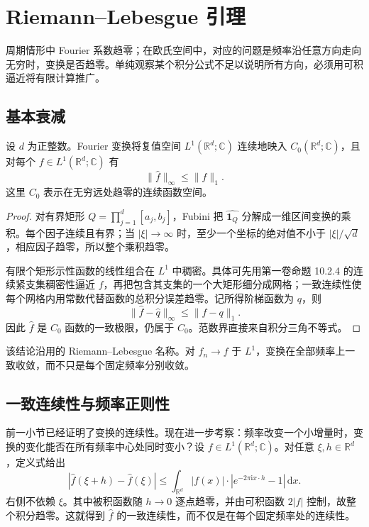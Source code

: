 \section{Riemann--Lebesgue 引理}
\label{b2:sec:0302}

周期情形中 Fourier 系数趋零；在欧氏空间中，对应的问题是频率沿任意方向走向无穷时，变换是否趋零。单纯观察某个积分公式不足以说明所有方向，必须用可积逼近将有限计算推广。

\subsection{基本衰减}
\label{b2:subsec:030201}

\begin{theorem}\label{b2:thm:03-riemann-lebesgue}
设 \(d\) 为正整数。Fourier 变换将复值空间 \(L^1(\mathbb R^d;\mathbb C)\) 连续地映入 \(C_0(\mathbb R^d;\mathbb C)\)，且对每个 \(f\in L^1(\mathbb R^d;\mathbb C)\) 有
\[
 \|\widehat f\|_\infty\leq\|f\|_1.
\]
这里 \(C_0\) 表示在无穷远处趋零的连续函数空间。
\end{theorem}
\begin{proof}
对有界矩形 \(Q=\prod_{j=1}^d[a_j,b_j]\)，Fubini 把 \(\widehat{\mathbf1_Q}\) 分解成一维区间变换的乘积。每个因子连续且有界；当 \(|\xi|\to\infty\) 时，至少一个坐标的绝对值不小于 \(|\xi|/\sqrt d\)，相应因子趋零，所以整个乘积趋零。

有限个矩形示性函数的线性组合在 \(L^1\) 中稠密。具体可先用第一卷命题 10.2.4 的连续紧支集稠密性逼近 \(f\)，再把包含其支集的一个大矩形细分成网格；一致连续性使每个网格内用常数代替函数的总积分误差趋零。记所得阶梯函数为 \(q\)，则
\[
 \|\widehat f-\widehat q\|_\infty\leq\|f-q\|_1.
\]
因此 \(\widehat f\) 是 \(C_0\) 函数的一致极限，仍属于 \(C_0\)。范数界直接来自积分三角不等式。
\end{proof}

该结论沿用的 Riemann--Lebesgue 名称。对 \(f_n\to f\) 于 \(L^1\)，变换在全部频率上一致收敛，而不只是每个固定频率分别收敛。

\subsection{一致连续性与频率正则性}
\label{b2:subsec:030202}

前一小节已经证明了变换的连续性。现在进一步考察：频率改变一个小增量时，变换的变化能否在所有频率中心处同时变小？设 \(f\in L^1(\mathbb R^d;\mathbb C)\)。对任意 \(\xi,h\in\mathbb R^d\)，定义式给出
\[
 |\widehat f(\xi+h)-\widehat f(\xi)|
 \leq\int_{\mathbb R^d}|f(x)|\cdot|e^{-2\pi\mathrm{i}x\cdot h}-1|\,\mathrm{d}x.
\]
右侧不依赖 \(\xi\)。其中被积函数随 \(h\to0\) 逐点趋零，并由可积函数 \(2|f|\) 控制，故整个积分趋零。这就得到 \(\widehat f\) 的一致连续性，而不仅是在每个固定频率处的连续性。

